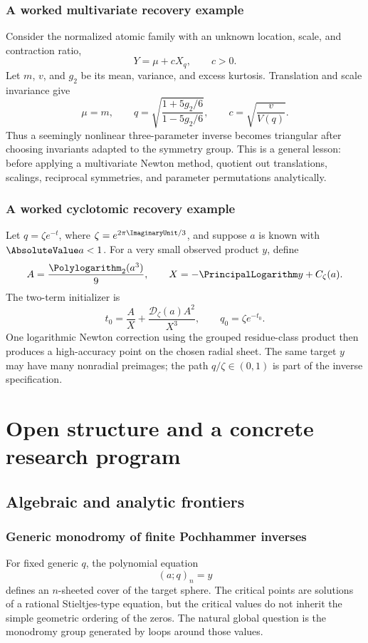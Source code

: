 \documentclass[11pt,letterpaper,oneside,openany]{book}
\theoremstyle{definition}
\theoremstyle{remark}
\newcommand{\Dcal}{\mathcal D}
\begin{document}
\section{A worked multivariate recovery example}
Consider the normalized atomic family with an unknown location, scale, and
contraction ratio,
\[
 Y=\mu+cX_q,
 \qquad c>0.
\]
Let \(m\), \(v\), and \(g_2\) be its mean, variance, and excess kurtosis.
Translation and scale invariance give
\[
 \mu=m,
 \qquad
 q=\sqrt{\frac{1+5g_2/6}{1-5g_2/6}},
 \qquad
 c=\sqrt{\frac{v}{V(q)}}.
\]
Thus a seemingly nonlinear three-parameter inverse becomes triangular after
choosing invariants adapted to the symmetry group.  This is a general lesson:
before applying a multivariate Newton method, quotient out translations,
scalings, reciprocal symmetries, and parameter permutations analytically.

\section{A worked cyclotomic recovery example}
Let \(q=\zeta e^{-t}\), where \(\zeta=e^{2\pi\ImaginaryUnit/3}\), and suppose \(a\) is
known with \(\AbsoluteValue a<1\).  For a very small observed product \(y\), define
\[
 A=\frac{\Polylogarithm_2(a^3)}9,
 \qquad
 X=-\PrincipalLogarithm y+C_\zeta(a).
\]
The two-term initializer is
\[
 t_0=\frac AX+\frac{\Dcal_\zeta(a)A^2}{X^3},
 \qquad q_0=\zeta e^{-t_0}.
\]
One logarithmic Newton correction using the grouped residue-class product then
produces a high-accuracy point on the chosen radial sheet.  The same target
\(y\) may have many nonradial preimages; the path \(q/\zeta\in(0,1)\) is part
of the inverse specification.

\part{Open structure and a concrete research program}

\chapter{Algebraic and analytic frontiers}

\section{Generic monodromy of finite Pochhammer inverses}
For fixed generic \(q\), the polynomial equation
\[
 (a;q)_n=y
\]
defines an \(n\)-sheeted cover of the target sphere.  The critical points are
solutions of a rational Stieltjes-type equation, but the critical values do not
inherit the simple geometric ordering of the zeros.  The natural global
question is the monodromy group generated by loops around those values.
\end{document}
